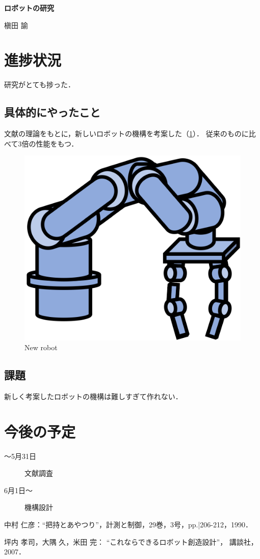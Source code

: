 \documentclass[a4paper,11pt,dvipdfmx]{jsarticle}
\begin{document}
\begin{center}
\bf \Large
ロボットの研究 %

\normalsize
槇田 諭 %
\end{center}

\pagestyle{fancy}


\section{進捗状況}

研究がとても捗った．


\subsection{具体的にやったこと}

文献\cite{nakamura1990jsice}の理論をもとに，新しいロボットの機構を考案した（\figurename\ref{fig:robot}）．
従来のもの\cite{korenara}に比べて3倍の性能をもつ．

\begin{figure}[!b]
\centering
\includegraphics[width=0.4\columnwidth, clip]
 {manipulator-crop.pdf}
\caption{New robot}
\label{fig:robot}
\end{figure}%


\subsection{課題}

新しく考案したロボットの機構は難しすぎて作れない．


\section{今後の予定}

\begin{description}
\item [〜5月31日] 文献調査
\item [6月1日〜] 機構設計
\end{description}

\begin{thebibliography}{9}
中村 仁彦：``把持とあやつり''，計測と制御，29巻，3号，pp.|206-212，1990．

坪内 孝司，大隅 久，米田 完：
``これならできるロボット創造設計''，
講談社，2007．

\end{thebibliography}
\end{document}
